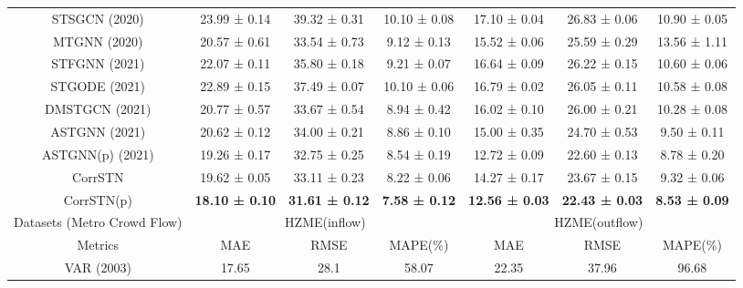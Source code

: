 \documentclass[sn-mathphys,iicol]{sn-jnl}
\theoremstyle{thmstyleone}\newtheorem{theorem}{Theorem}\newtheorem{proposition}[theorem]{Proposition}
\theoremstyle{thmstyletwo}\newtheorem{example}{Example}\newtheorem{remark}{Remark}
\theoremstyle{thmstylethree}\newtheorem{definition}{Definition}
\begin{document}
\begin{table*}[!h]
{\begin{tabular}{c|ccc|ccc}
STSGCN (2020)                   & 23.99 ± 0.14          & 39.32 ± 0.31          & 10.10 ± 0.08          & 17.10 ± 0.04          & 26.83 ± 0.06          & 10.90 ± 0.05          \\
MTGNN (2020)                    & 20.57 ± 0.61          & 33.54 ± 0.73          & 9.12 ± 0.13           & 15.52 ± 0.06          & 25.59 ± 0.29          & 13.56 ± 1.11          \\
STFGNN (2021)                   & 22.07 ± 0.11          & 35.80 ± 0.18          & 9.21 ± 0.07           & 16.64 ± 0.09          & 26.22 ± 0.15          & 10.60 ± 0.06          \\
STGODE (2021)                   & 22.89 ± 0.15          & 37.49 ± 0.07          & 10.10 ± 0.06          & 16.79 ± 0.02          & 26.05 ± 0.11          & 10.58 ± 0.08          \\
DMSTGCN (2021)                  & 20.77 ± 0.57          & 33.67 ± 0.54          & 8.94 ± 0.42           & 16.02 ± 0.10          & 26.00 ± 0.21          & 10.28 ± 0.08          \\
ASTGNN (2021)                   & 20.62 ± 0.12          & 34.00 ± 0.21          & 8.86 ± 0.10           & 15.00 ± 0.35          & 24.70 ± 0.53          & 9.50 ± 0.11           \\
ASTGNN(p) (2021)                & 19.26 ± 0.17          & 32.75 ± 0.25          & 8.54 ± 0.19           & 12.72 ± 0.09          & 22.60 ± 0.13          & 8.78 ± 0.20           \\ \hline
CorrSTN                         & 19.62 ± 0.05          & 33.11 ± 0.23          & 8.22 ± 0.06           & 14.27 ± 0.17          & 23.67 ± 0.15          & 9.32 ± 0.06           \\
CorrSTN(p)                      & \textbf{18.10 ± 0.10} & \textbf{31.61 ± 0.12} & \textbf{7.58 ± 0.12}  & \textbf{12.56 ± 0.03} & \textbf{22.43 ± 0.03} & \textbf{8.53 ± 0.09}  \\ \hline \hline
Datasets (Metro Crowd Flow)     & \multicolumn{3}{c|}{HZME(inflow)}                                     & \multicolumn{3}{c}{HZME(outflow)}                                     \\ \hline
Metrics                         & MAE                   & RMSE                  & MAPE(\%)              & MAE                   & RMSE                  & MAPE(\%)              \\ \hline
VAR (2003)                      & 17.65                 & 28.1                  & 58.07                 & 22.35                 & 37.96                 & 96.68                 \\

\end{tabular}}
\end{table*}
\end{document}
